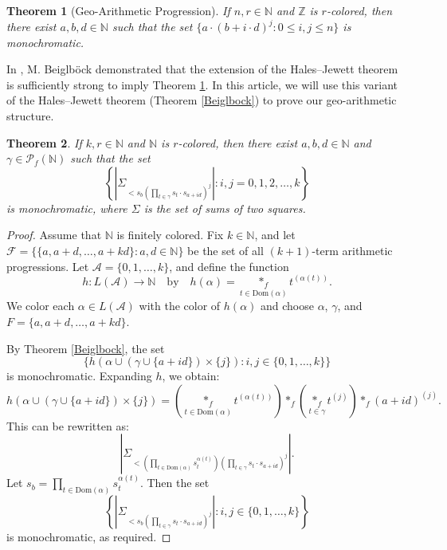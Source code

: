 \documentclass[12pt]{amsart}
\theoremstyle{plain}
\newtheorem{theorem}{Theorem}[section]
\theoremstyle{definition}
\theoremstyle{remark}
\numberwithin{equation}{section}
\newcommand{\Dom}{\mathrm{Dom}}
\begin{document}
\begin{theorem}[Geo-Arithmetic Progression] \label{Originalgeoarith}
If \( n, r \in \mathbb{N} \) and \( \mathbb{Z} \) is \( r \)-colored, then there exist \( a, b, d \in \mathbb{N} \) such that the set \( \{a \cdot (b + i \cdot d)^j : 0 \leq i, j \leq n\} \) is monochromatic.
\end{theorem}

In \cite{Beigl08}, M. Beiglb\"{o}ck demonstrated that the extension of the Hales–Jewett theorem is sufficiently strong to imply Theorem \ref{Originalgeoarith}. In this article, we will use this variant of the Hales–Jewett theorem (Theorem \ref{Beiglbock}) to prove our geo-arithmetic structure.

\begin{theorem} \label{Geoarith}
If \( k, r \in \mathbb{N} \) and \( \mathbb{N} \) is \( r \)-colored, then there exist \( a, b, d \in \mathbb{N} \) and \( \gamma \in \mathcal{P}_f(\mathbb{N}) \) such that the set 
\[
\left\{\left|\Sigma_{<s_b \left(\prod_{t \in \gamma} s_t \cdot s_{a + i d}\right)^j}\right| : i, j = 0, 1, 2, \dots, k\right\}
\]
is monochromatic, where \( \Sigma \) is the set of sums of two squares.
\end{theorem}

\begin{proof}
Assume that \( \mathbb{N} \) is finitely colored. Fix \( k \in \mathbb{N} \), and let \( \mathcal{F} = \{\{a, a + d, \dots, a + k d\} : a, d \in \mathbb{N}\} \) be the set of all \( (k + 1) \)-term arithmetic progressions. Let \( \mathcal{A} = \{0, 1, \dots, k\} \), and define the function 
\[
h : L(\mathcal{A}) \rightarrow \mathbb{N} \quad \text{by} \quad h(\alpha) = \underset{t \in \Dom(\alpha)}{\ast_f} t^{(\alpha(t))}.
\]
We color each \( \alpha \in L(\mathcal{A}) \) with the color of \( h(\alpha) \) and choose \( \alpha \), \( \gamma \), and \( F = \{a, a + d, \dots, a + k d\} \).

By Theorem \ref{Beiglbock}, the set 
\[
\{h(\alpha \cup (\gamma \cup \{a + i d\}) \times \{j\}) : i, j \in \{0, 1, \dots, k\}\}
\]
is monochromatic. Expanding \( h \), we obtain:
\[
h(\alpha \cup (\gamma \cup \{a + i d\}) \times \{j\}) = \left(\underset{t \in \Dom(\alpha)}{\ast_f} t^{(\alpha(t))}\right) \ast_f \left(\underset{t \in \gamma}{\ast_f} t^{(j)}\right) \ast_f (a + i d)^{(j)}.
\]
This can be rewritten as:
\[
\left|\Sigma_{<\left(\prod_{t \in \Dom(\alpha)} s_t^{\alpha(t)}\right) \left(\prod_{t \in \gamma} s_t \cdot s_{a + i d}\right)^j}\right|.
\]
Let \( s_b = \prod_{t \in \Dom(\alpha)} s_t^{\alpha(t)} \). Then the set 
\[
\left\{\left|\Sigma_{<s_b \left(\prod_{t \in \gamma} s_t \cdot s_{a + i d}\right)^j}\right| : i, j \in \{0, 1, \dots, k\}\right\}
\]
is monochromatic, as required.
\end{proof}
\end{document}
